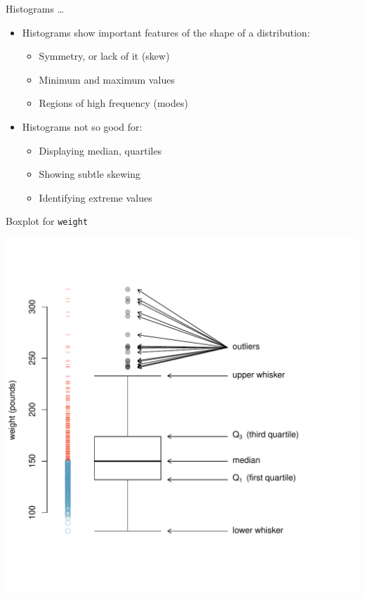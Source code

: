 \documentclass[10pt]{beamer}\usepackage[]{graphicx}\usepackage[]{color}
\newenvironment{knitrout}{}{} %
\begin{document}
\begin{frame}{Histograms \dots}
			\protect\hypertarget{histograms-1}{}

\begin{itemize}
\item Histograms show important features of the shape of a distribution:
			
			\begin{itemize}
				\item
				Symmetry, or lack of it (skew)
				\item
				Minimum and maximum values
				\item
				Regions of high frequency (modes)
			\end{itemize}
	\pause		
		\item 	Histograms not so good for:
			
			\begin{itemize}
				\item
				Displaying median, quartiles
				\item
				Showing subtle skewing
				\item
				Identifying extreme values
			\end{itemize}

\end{itemize}			
			
\end{frame}
		
\begin{frame}[fragile]{Boxplot for \texttt{weight}}
			\protect\hypertarget{oi-biostat-figure-1.20-frog-data}{}
			
\begin{knitrout}\tiny
{}\color{fgcolor}

{\centering \includegraphics[width=0.85\linewidth]{figure/boxplot-1} 

}



\end{knitrout}
			
\end{frame}
		
\end{document}

